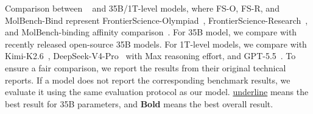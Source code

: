 \begin{table}[]
    \centering
    \footnotesize
    \setlength{\tabcolsep}{1.9pt}
    \caption{Comparison between \ProjectName~ and 35B/1T-level models, where FS-O, FS-R, and MolBench-Bind represent FrontierScience-Olympiad~\citep{frontierscience}, FrontierScience-Research~\citep{frontierscience}, and MolBench-binding affinity comparison~\citep{zhang2026molclaw}. For 35B model, we compare with recently released open-source 35B models. For 1T-level models, we compare with Kimi-K2.6~\citep{kimi2.6}, DeepSeek-V4-Pro~\citep{deepseekai2026deepseekv4} with Max reasoning effort, and GPT-5.5~\citep{GPT5.5}. To ensure a fair comparison, we report the results from their original technical reports. If a model does not report the corresponding benchmark results, we evaluate it using the same evaluation protocol as our model. \underline{underline} means the best result for 35B parameters, and \textbf{Bold} means the best overall result. }
    \label{tab:main_results}


\end{table}
